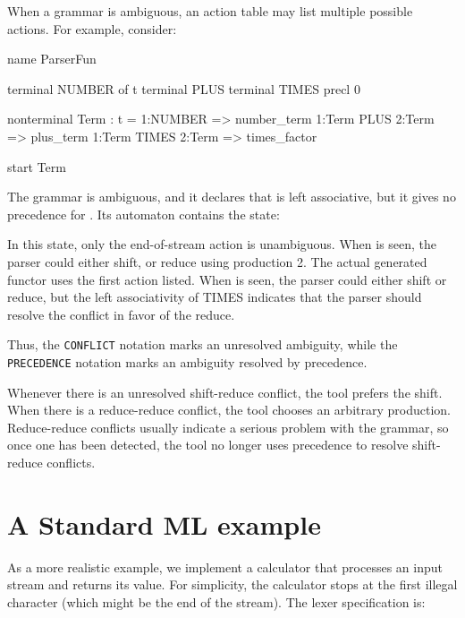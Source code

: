 \documentclass[10pt]{article}
\begin{document}
\begin{strictcode}
\begin{strictcode}
\begin{strictcode}
\begin{strictcode}
\begin{strictcode}
\begin{strictcode}
\begin{strictcode}
\begin{strictcode}
\begin{strictcode}
\begin{strictcode}
\begin{strictcode}
When a grammar is ambiguous, an action table may list multiple
possible actions.  For example, consider:

\begin{code}
name ParserFun

terminal NUMBER of t
terminal PLUS
terminal TIMES precl 0

nonterminal Term : t =
  1:NUMBER => number_term
  1:Term PLUS 2:Term => plus_term
  1:Term TIMES 2:Term => times_factor

start Term
\end{code}

The grammar is ambiguous, and it declares that  is left
associative, but it gives no precedence for .  Its automaton
contains the state:


In this state, only the end-of-stream action is unambiguous.  When
 is seen, the parser could either shift, or reduce using
production 2.  The actual generated functor uses the first action
listed.  When  is seen, the parser could either shift or
reduce, but the left associativity of TIMES indicates that the parser
should resolve the conflict in favor of the reduce.

Thus, the {\tt CONFLICT} notation marks an unresolved ambiguity, while
the {\tt PRECEDENCE} notation marks an ambiguity resolved by
precedence.

Whenever there is an unresolved shift-reduce conflict, the tool
prefers the shift.  When there is a reduce-reduce conflict, the tool
chooses an arbitrary production.  Reduce-reduce conflicts usually
indicate a serious problem with the grammar, so once one has been
detected, the tool no longer uses precedence to resolve shift-reduce
conflicts.


\section{A Standard ML example}
\label{sec:example-sml}

As a more realistic example, we implement a calculator that processes
an input stream and returns its value.  For simplicity, the calculator
stops at the first illegal character (which might be the end of the
stream).  The lexer specification is:


\end{strictcode}
\end{strictcode}
\end{strictcode}
\end{strictcode}
\end{strictcode}
\end{strictcode}
\end{strictcode}
\end{strictcode}
\end{strictcode}
\end{strictcode}
\end{strictcode}
\end{document}
